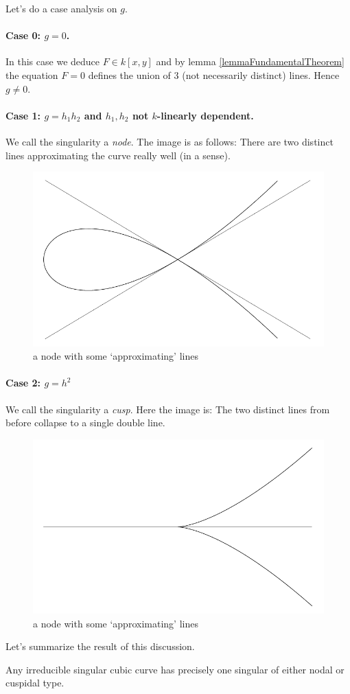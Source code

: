 Let's do a case analysis on $g$.
\paragraph{Case 0: $g=0$.}
In this case we deduce $F \in k[x,y]$ and by lemma \ref{lemmaFundamentalTheorem} the equation $F=0$ defines the union of 3 (not necessarily distinct) lines.
Hence $g \neq 0$.
\paragraph{Case 1: $g=h_1h_2$ and $h_1,h_2$ not $k$-linearly dependent.}
We call the singularity a \emph{node}.
The image is as follows: There are two distinct lines approximating the curve really well (in a sense).
\begin{figure}
\center
\includegraphics[width=.5\textwidth]{img/cuspidal.pdf}
\caption{a node with some `approximating' lines}
\end{figure}
\paragraph{Case 2: $g=h^2$}
We call the singularity a \emph{cusp}.
Here the image is: The two distinct lines from before collapse to a single double line.
\begin{figure}
\center
\includegraphics[width=.5\textwidth]{img/nodal.pdf}
\caption{a node with some `approximating' lines}
\end{figure}

Let's summarize the result of this discussion.

\begin{proposition} \label{propositionClassificationOfSingularCubics}
Any irreducible singular cubic curve has precisely one singular of either nodal or cuspidal type.
\end{proposition}


